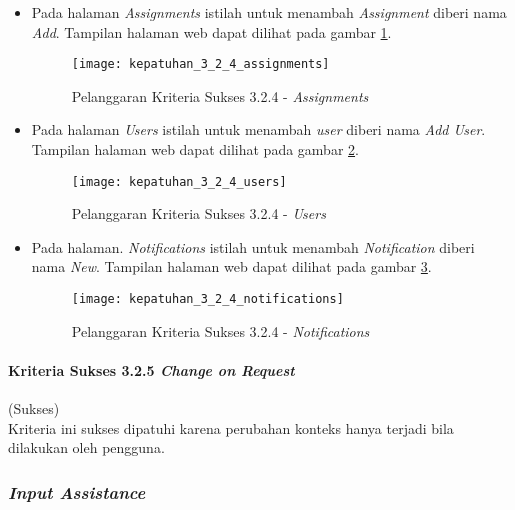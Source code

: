 \begin{itemize}
	\item Pada halaman \textit{Assignments} istilah untuk menambah \textit{Assignment} diberi nama \textit{Add}. Tampilan halaman web dapat dilihat pada gambar \ref{fig:kepatuhan_3_2_4_assignments}.
	\begin{figure}[H]
		\centering  
		\texttt{[image: kepatuhan\_3\_2\_4\_assignments]}  
		\caption[Pelanggaran Kriteria Sukses 3.2.4 - \textit{Assignments}]{Pelanggaran Kriteria Sukses 3.2.4 - \textit{Assignments}} 
		\label{fig:kepatuhan_3_2_4_assignments} 
	\end{figure}

	\item Pada halaman \textit{Users} istilah untuk menambah \textit{user} diberi nama \textit{Add User}. Tampilan halaman web dapat dilihat pada gambar \ref{fig:kepatuhan_3_2_4_users}.
	\begin{figure}[H]
		\centering  
		\texttt{[image: kepatuhan\_3\_2\_4\_users]}  
		\caption[Pelanggaran Kriteria Sukses 3.2.4 - \textit{Users}]{Pelanggaran Kriteria Sukses 3.2.4 - \textit{Users}} 
		\label{fig:kepatuhan_3_2_4_users} 
	\end{figure}

	\item Pada halaman. \textit{Notifications} istilah untuk menambah \textit{Notification} diberi nama \textit{New}. Tampilan halaman web dapat dilihat pada gambar \ref{fig:kepatuhan_3_2_4_notifications}.
	\begin{figure}[H]
		\centering  
		\texttt{[image: kepatuhan\_3\_2\_4\_notifications]}  
		\caption[Pelanggaran Kriteria Sukses 3.2.4 - \textit{Notifications}]{Pelanggaran Kriteria Sukses 3.2.4 - \textit{Notifications}} 
		\label{fig:kepatuhan_3_2_4_notifications} 
	\end{figure}

\end{itemize}

\paragraph{Kriteria Sukses 3.2.5 \textit{Change on Request}}
\label{subsubsec:kepatuhan_kriteria_3.2.5}
(Sukses) \\

Kriteria ini sukses dipatuhi karena perubahan konteks hanya terjadi bila dilakukan oleh pengguna.

\subsubsection{\textit{Input Assistance}}
\label{subsubsec:input_assistance}

